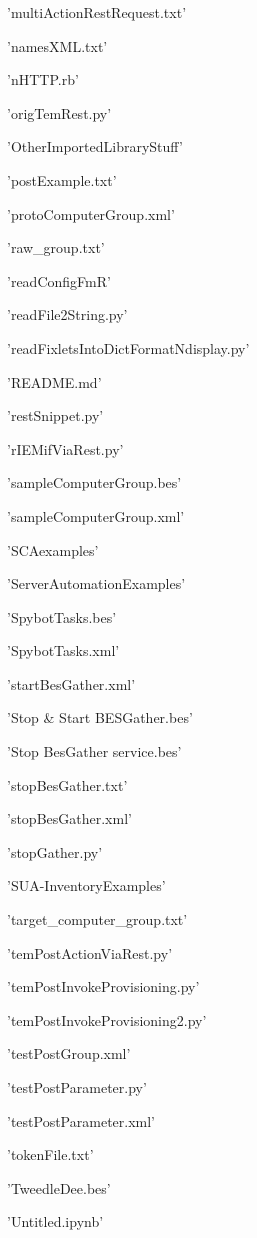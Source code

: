 \documentclass[11pt]{article}
\begin{document}
\begin{enumerate*}
\item 'multiActionRestRequest.txt'
\item 'namesXML.txt'
\item 'nHTTP.rb'
\item 'origTemRest.py'
\item 'OtherImportedLibraryStuff'
\item 'postExample.txt'
\item 'protoComputerGroup.xml'
\item 'raw\_group.txt'
\item 'readConfigFmR'
\item 'readFile2String.py'
\item 'readFixletsIntoDictFormatNdisplay.py'
\item 'README.md'
\item 'restSnippet.py'
\item 'rIEMifViaRest.py'
\item 'sampleComputerGroup.bes'
\item 'sampleComputerGroup.xml'
\item 'SCAexamples'
\item 'ServerAutomationExamples'
\item 'SpybotTasks.bes'
\item 'SpybotTasks.xml'
\item 'startBesGather.xml'
\item 'Stop \& Start BESGather.bes'
\item 'Stop BesGather service.bes'
\item 'stopBesGather.txt'
\item 'stopBesGather.xml'
\item 'stopGather.py'
\item 'SUA-InventoryExamples'
\item 'target\_computer\_group.txt'
\item 'temPostActionViaRest.py'
\item 'temPostInvokeProvisioning.py'
\item 'temPostInvokeProvisioning2.py'
\item 'testPostGroup.xml'
\item 'testPostParameter.py'
\item 'testPostParameter.xml'
\item 'tokenFile.txt'
\item 'TweedleDee.bes'
\item 'Untitled.ipynb'
\end{enumerate*}
\end{document}
